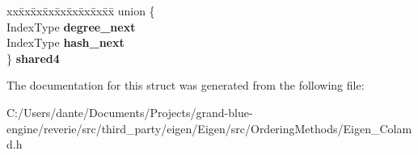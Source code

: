 \begin{DoxyCompactItemize}
\begin{tabbing}
\end{tabbing}\item 
\mbox{\label{structinternal_1_1colamd__col_ab90aac45c56751925cc59f3061b7c26b}} 
\begin{tabbing}
xx\=xx\=xx\=xx\=xx\=xx\=xx\=xx\=xx\=\kill
union \{\\
\>IndexType {\bfseries degree\_next}\\
\>IndexType {\bfseries hash\_next}\\
\} {\bfseries shared4}\\

\end{tabbing}\end{DoxyCompactItemize}


The documentation for this struct was generated from the following file\+:\begin{DoxyCompactItemize}
\item 
C\+:/\+Users/dante/\+Documents/\+Projects/grand-\/blue-\/engine/reverie/src/third\+\_\+party/eigen/\+Eigen/src/\+Ordering\+Methods/Eigen\+\_\+\+Colamd.\+h\end{DoxyCompactItemize}
